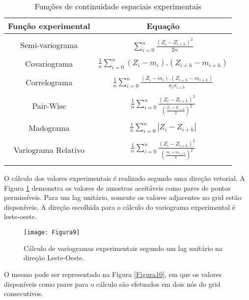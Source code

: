 \begin{table}[h]
	\centering
	\caption{Funções de continuidade espaciais experimentais}
	\label{Tabela 3}
	\begin{tabular}{cc}
		\toprule
		\textbf{Função experimental} &  \textbf{Equação} \\\midrule \\
		Semi-variograma                      & $\sum_{i=0}^{n}\frac{\left( Z_i - Z_{i+h} \right)^2 }{2n} $      \\ \\
		Covariograma                        & $\frac{1}{n}\sum_{i=0}^{n} (Z_i-m_i).(Z_{i+h}-m_{i+h})$       \\ \\
		Correlograma                       & $\frac{1}{n}\sum_{i=0}^{n}\frac{ (Z_i-m_i).(Z_{i+h}-m_{i+h})}{\sigma_i\sigma_{i+h}}$   \\   \\
		Pair-Wise                       & $\frac{1}{n}\sum_{i=0}^{n} \frac{(Z_i-Z_{i+h})^2}{\left( \frac{Z_i + Z_{i+h}}{2}\right)^2}$      \\ \\
		Madograma                      & $\frac{1}{n} \sum_{i=0}^{n} \left| Z_i -Z_{i+h} \right|  $       \\ \\ 
		Variograma Relativo              & 
		$\frac{1}{n}\sum_{i=0}^{n} \frac{(Z_i-Z_{i+h})^2}{\left( \frac{m_i + m_{i+h}}{2}\right)^2}$      \\ \\ \bottomrule     
	\end{tabular}
\end{table}

O cálculo dos valores experimentais é realizado segundo uma direção vetorial. A Figura \ref{Figura9} demonstra os valores de amostras aceitáveis como pares de pontos permissíveis. Para um lag unitário, somente os valores adjacentes no grid estão disponíveis. A direção escolhida para o cálculo do variograma experimental é leste-oeste. 

\begin{figure}[!]
	\centering
	\texttt{[image: Figura9]}
	\caption{Cálculo de variogramas experimentais segundo um lag unitário na direção Leste-Oeste.}
	\label{Figura9}
\end{figure}

O mesmo pode ser representado na Figura \ref{Figura10}, em que os valores disponíveis como pares para o cálculo são efetuados em dois nós do grid consecutivos. 

